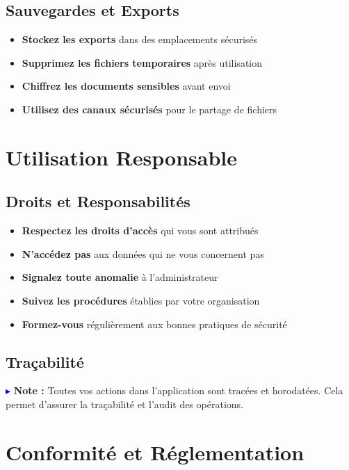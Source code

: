 \documentclass[12pt,a4paper]{report}
\begin{document}
\subsection{Sauvegardes et Exports}

\begin{itemize}[leftmargin=*]
    \item \textbf{Stockez les exports} dans des emplacements sécurisés
    \item \textbf{Supprimez les fichiers temporaires} après utilisation
    \item \textbf{Chiffrez les documents sensibles} avant envoi
    \item \textbf{Utilisez des canaux sécurisés} pour le partage de fichiers
\end{itemize}

\section{Utilisation Responsable}

\subsection{Droits et Responsabilités}

\begin{itemize}[leftmargin=*]
    \item \textbf{Respectez les droits d'accès} qui vous sont attribués
    \item \textbf{N'accédez pas} aux données qui ne vous concernent pas
    \item \textbf{Signalez toute anomalie} à l'administrateur
    \item \textbf{Suivez les procédures} établies par votre organisation
    \item \textbf{Formez-vous} régulièrement aux bonnes pratiques de sécurité
\end{itemize}

\subsection{Traçabilité}

\textcolor{blue}{$\blacktriangleright$} \textbf{Note :} Toutes vos actions dans l'application sont tracées et horodatées. Cela permet d'assurer la traçabilité et l'audit des opérations.

\section{Conformité et Réglementation}
\end{document}
